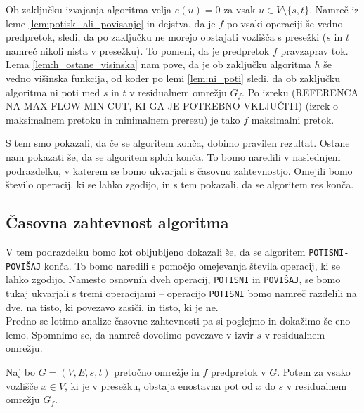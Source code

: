 \documentclass[mat1]{fmfdelo}
\begin{document}
\begin{dokaz}
Ob zaključku izvajanja algoritma velja $e(u) = 0$ za vsak $u \in V\setminus \{s,t\}$. Namreč iz leme \ref{lem:potisk_ali_povisanje} in dejstva, da je $f$ po vsaki operaciji še vedno predpretok, sledi, da po zaključku ne morejo obstajati vozlišča s presežki ($s$ in $t$ namreč nikoli nista v presežku). To pomeni, da je predpretok $f$ pravzaprav tok. Lema \ref{lem:h_ostane_visinska} nam pove, da je ob zaključku algoritma $h$ še vedno višinska funkcija, od koder po lemi \ref{lem:ni_poti} sledi, da ob zaključku algoritma ni poti med $s$ in $t$ v residualnem omrežju $G_f$. Po izreku (REFERENCA NA MAX-FLOW MIN-CUT, KI GA JE POTREBNO VKLJUČITI) (izrek o maksimalnem pretoku in minimalnem prerezu) je tako $f$ maksimalni pretok.
\end{dokaz}

S tem smo pokazali, da če se algoritem konča, dobimo pravilen rezultat. Ostane nam pokazati še, da se algoritem sploh konča. To bomo naredili v naslednjem podrazdelku, v katerem se bomo ukvarjali s časovno zahtevnostjo. Omejili bomo število operacij, ki se lahko zgodijo, in s tem pokazali, da se algoritem res konča.\\

\subsection{Časovna zahtevnost algoritma}

V tem podrazdelku bomo kot obljubljeno dokazali še, da se algoritem \texttt{POTISNI-POVIŠAJ} konča. To bomo naredili s pomočjo omejevanja števila operacij, ki se lahko zgodijo. Namesto osnovnih dveh operacij, \texttt{POTISNI} in \texttt{POVIŠAJ}, se bomo tukaj ukvarjali s tremi operacijami -- operacijo \texttt{POTISNI} bomo namreč razdelili na dve, na tisto, ki povezavo zasiči, in tisto, ki je ne.\\

Predno se lotimo analize časovne zahtevnosti pa si poglejmo in dokažimo še eno lemo. Spomnimo se, da namreč dovolimo povezave v izvir $s$ v residualnem omrežju.\\

\begin{lema}\label{lem:enostavna_pot_s}
Naj bo $G=(V,E,s,t)$ pretočno omrežje in $f$ predpretok v $G$. Potem za vsako vozlišče $x\in V$, ki je v presežku, obstaja enostavna pot od $x$ do $s$ v residualnem omrežju $G_f$.
\end{lema}
\end{document}
